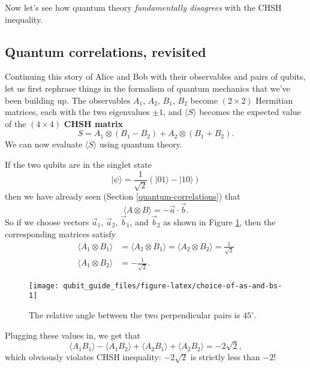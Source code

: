 \documentclass[fleqn]{article}
\renewcommand{\footnote}[1]{\en{#1}}
\begin{document}
Now let's see how quantum theory \emph{fundamentally disagrees} with the CHSH inequality.

\hypertarget{quantum-correlations-revisited}{%
\subsection{Quantum correlations, revisited}\label{quantum-correlations-revisited}}

Continuing this story of Alice and Bob with their observables and pairs of qubits, let us first rephrase things in the formalism of quantum mechanics that we've been building up.
The observables \(A_1\), \(A_2\), \(B_1\), \(B_2\) become \((2\times 2)\) Hermitian matrices, each with the two eigenvalues \(\pm 1\), and \(\langle S\rangle\) becomes the expected value of the \((4\times 4)\) \textbf{CHSH matrix}
\[
  S = A_1\otimes(B_1-B_2) + A_2\otimes(B_1+B_2).
\]
We can now evaluate \(\langle S\rangle\) using quantum theory.

If the two qubits are in the singlet state
\[
  |\psi\rangle
  = \frac{1}{\sqrt{2}} \left( |01\rangle-|10\rangle \right)
\]
then we have already seen (Section \ref{quantum-correlations}) that
\[
  \langle A\otimes B\rangle = -\vec{a}\cdot\vec{b}.
\]
So if we choose vectors \(\vec{a}_1\), \(\vec{a}_2\), \(\vec{b}_1\), and \(\vec{b}_2\) as shown in Figure \ref{fig:choice-of-as-and-bs}, then the corresponding matrices\footnote{That is, \(A_1=\vec{a}_1\cdot\vec{\sigma}\), and so on.} satisfy
\[
\begin{aligned}
  \langle A_1\otimes B_1\rangle
  &= \langle A_2\otimes B_1\rangle
  = \langle A_2\otimes B_2\rangle
  = \frac{1}{\sqrt{2}}
\\\langle A_1\otimes B_2\rangle
  &= -\frac{1}{\sqrt{2}}.
\end{aligned}
\]



\begin{figure}[H]

{\centering \texttt{[image: qubit\_guide\_files/figure-latex/choice-of-as-and-bs-1]} 

}

\caption{The relative angle between the two perpendicular pairs is \(45^\circ\).}\label{fig:choice-of-as-and-bs}
\end{figure}

Plugging these values in, we get that
\[
  \langle A_1 B_1\rangle - \langle A_1 B_2\rangle + \langle A_2 B_1\rangle + \langle A_2 B_2\rangle
  = -2\sqrt{2},
\]
which obviously violates CHSH inequality: \(-2\sqrt{2}\) is strictly less than \(-2\)!
\end{document}
